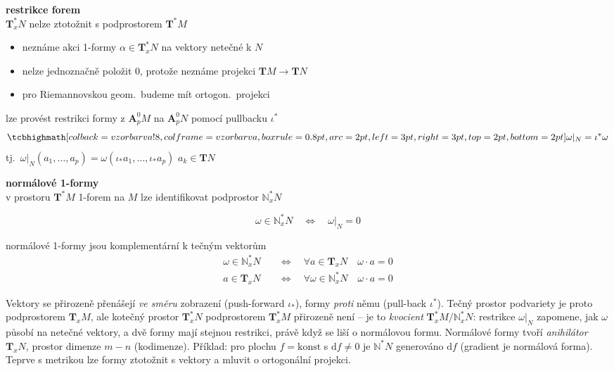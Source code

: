 \textbf{restrikce forem} \\
$\mathbf{T}^*_x N$ nelze ztotožnit s podprostorem $\mathbf{T}^*M$
\begin{itemize}[nosep]
  \item[] neznáme akci 1-formy $\alpha\in\mathbf{T}^*_xN$ na vektory netečné k $N$
  \item[] nelze jednoznačně položit $0$, protože neznáme projekci $\mathbf{T}M\to\mathbf{T}N$
  \item[] pro Riemannovskou geom.\ budeme mít ortogon.\ projekci
\end{itemize}
lze provést restrikci formy z $\mathbf{A}^0_pM$ na $\mathbf{A}^0_pN$ pomocí pullbacku $\iota^*$
\[
  \vzorec{\omega|_N = \iota^*\omega}
\]
tj.\ $\omega|_N(a_1,\dots,a_p) = \omega(\iota_*a_1,\dots,\iota_*a_p)$ \qquad $a_k\in\mathbf{T}N$

\textbf{normálové 1-formy} \\
v prostoru $\mathbf{T}^*M$ 1-forem na $M$ lze identifikovat podprostor $\mathbb{N}^*_xN$ 
\begin{definice}
\[
  \omega\in\mathbb{N}^*_xN \quad\Leftrightarrow\quad \omega|_N = 0
\]
\end{definice}
normálové 1-formy jsou komplementární k tečným vektorům
\begin{align*}
  \omega\in\mathbb{N}^*_xN &\quad\Leftrightarrow\quad \forall a\in\mathbf{T}_xN \quad \omega\cdot a = 0 \\
  a\in\mathbf{T}_xN &\quad\Leftrightarrow\quad \forall\omega\in\mathbb{N}^*_xN \quad \omega\cdot a = 0
\end{align*}

\begin{vysvetleni}
Vektory se přirozeně přenášejí \emph{ve směru} zobrazení (push-forward $\iota_*$), formy \emph{proti} němu (pull-back $\iota^*$). Tečný prostor podvariety je proto podprostorem $\mathbf{T}_xM$, ale kotečný prostor $\mathbf{T}^*_xN$ podprostorem $\mathbf{T}^*_xM$ přirozeně není -- je to \emph{kvocient} $\mathbf{T}^*_xM/\mathbb{N}^*_xN$: restrikce $\omega|_N$ zapomene, jak $\omega$ působí na netečné vektory, a dvě formy mají stejnou restrikci, právě když se liší o normálovou formu.
Normálové formy tvoří \emph{anihilátor} $\mathbf{T}_xN$, prostor dimenze $m-n$ (kodimenze). Příklad: pro plochu $f=\text{konst}$ s $\mathrm{d}f\neq0$ je $\mathbb{N}^*N$ generováno $\mathrm{d}f$ (gradient je normálová forma). Teprve s metrikou lze formy ztotožnit s vektory a mluvit o ortogonální projekci.
\end{vysvetleni}

